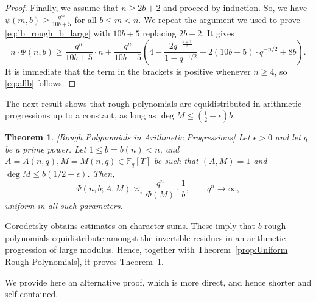 \documentclass[12pt]{amsart}
\numberwithin{equation}{section}
\newtheorem{theorem}{Theorem}[section]
\theoremstyle{definition}
\theoremstyle{remark}
\newcommand{\FF}{\mathbb{F}}
\newcommand{\ps}[1]{\left( #1 \right)}
\begin{document}
\begin{proof}
    Finally, we assume that $n\geq 2b+2$ and proceed by induction. So, we have $\psi(m,b)\geq \frac{q^m}{10b+5}$ for all $b\leq m<n$. We repeat the argument we used to prove \eqref{eq:lb_rough_b_large} with $10b+5$ replacing $2b+2$. It gives
    \[
        n \cdot \Psi(n,b) \geq \frac{q^n}{10 b+5} \cdot n + \frac{q^n}{10 b+5} \ps{4-\frac{2q^{-\frac{b+1}{2}}}{1-q^{-1/2}} - 2(10b+5) \cdot q^{-n/2} + 8b}.
    \]
    It is immediate that the term in the brackets is positive whenever $n\geq 4$, so \eqref{eq:allb} follows.
\end{proof}

The next result shows that rough polynomials are equidistributed in arithmetic progressions up to a constant, as long as $\deg M \leq (\frac{1}{2}-\epsilon) b$.

\begin{theorem}\label{lm:rough_polynomialsAP} [Rough Polynomials in Arithmetic Progressions]
    Let $\epsilon > 0$ and let $q$ be a prime power. Let $1\leq b=b(n) < n$, and $A=A(n,q),M=M(n,q) \in\FF_q[T]$ be such that $(A,M)=1$ and $\deg M \leq b(1/2-\epsilon)$. Then,
    \[
    \Psi(n,b;A,M) \asymp_\epsilon \frac{q^n}{\Phi(M)} \cdot \frac{1}{b}, \qquad q^n \to \infty,
    \]    
uniform in all such parameters.
\end{theorem}


    Gorodetsky \cite[Theorem 2.1]{Gorodetsky} obtains estimates on character sums. These imply that $b$-rough polynomials equidistribute amongst the invertible residues in an arithmetic progression of large modulus. Hence, together with Theorem~\ref{prop:Uniform Rough Polynomials}, it proves Theorem~\ref{lm:rough_polynomialsAP}. 

    We provide here an alternative proof, which is more direct, and hence shorter and self-contained.
\end{document}
